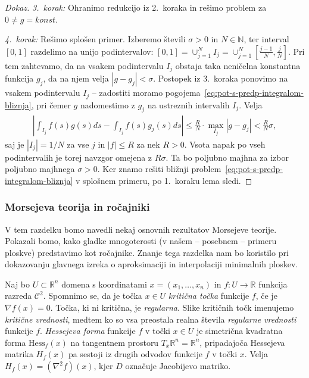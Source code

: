 \documentclass[12pt,a4paper,twoside]{article}
\theoremstyle{definition} %
\newenvironment{dokaz}[1][Dokaz]{\begin{proof}[#1]}{\end{proof}}
\theoremstyle{plain} %
\numberwithin{equation}{section}  %
\newcommand{\R}{\mathbb R}
\begin{document}
\begin{dokaz}
\textit{3.~korak:} Ohranimo redukcijo iz 2.~koraka in rešimo problem za $0 \neq g = konst.$ \newline

\textit{4.~korak:} Rešimo splošen primer. \newline
Izberemo števili $\sigma > 0$ in $N \in \mathbb{N}$, ter interval $[0,1]$ razdelimo na unijo podintervalov: $[0,1] = \cup_{j=1}^{N} I_{j} = \cup_{j=1}^{N} [\frac{j-1}{N}, \frac{j}{N}]$. Pri tem zahtevamo, da na vsakem podintervalu $I_{j}$ obstaja taka neničelna konstantna funkcija $g_{j}$, da na njem velja $|g - g_{j}| < \sigma$.
Postopek iz 3.~koraka ponovimo na vsakem podintervalu $I_{j}$ -- zadostiti moramo pogojema~\eqref{eq:pot-s-predp-integralom-bliznja}, pri čemer $g$ nadomestimo z $g_{j}$ na ustreznih intervalih $I_{j}$.
Velja
\begin{gather*}
\left| \int_{I_{j}} f(s)g(s)ds - \int_{I_{j}} f(s)g_{j}(s)ds \right| \leq \frac{R}{N} \cdot \max_{I_{j}} |g - g_{j}| < \frac{R}{N} \sigma,
\end{gather*}
saj je $|I_{j}| = 1/N$ za vse $j$ in $|f| \leq R$ za nek $R > 0$.
Vsota napak po vseh podintervalih je torej navzgor omejena z $R \sigma$. Ta bo poljubno majhna za izbor poljubno majhnega $\sigma >0$.
Ker znamo rešiti bližnji problem~\eqref{eq:pot-s-predp-integralom-bliznja} v splošnem primeru, po 1.~koraku lema sledi.
\end{dokaz}

\subsubsection{Morsejeva teorija in ročajniki}
%
V tem razdelku bomo navedli nekaj osnovnih rezultatov Morsejeve teorije. Pokazali bomo, kako gladke mnogoterosti (v našem -- posebnem -- primeru ploskve) predstavimo kot ročajnike. Znanje tega razdelka nam bo koristilo pri dokazovanju glavnega izreka o aproksimaciji in interpolaciji minimalnih ploskev.
   
Naj bo $U \subset \mathbb{R}^{n}$ domena s koordinatami $x = (x_{1}, \dots , x_{n})$ in $f \colon U \to \mathbb{R}$ funkcija razreda $\mathcal{C}^{2}$.
Spomnimo se, da je točka $x \in U$ \emph{kritična točka} funkcije $f$, če je $\nabla f(x) = 0$. Točka, ki ni kritična, je \emph{regularna}.
Slike kritičnih točk imenujemo \emph{kritične vrednosti}, medtem ko so vsa preostala realna števila \emph{regularne vrednosti} funkcije $f$. \newline
%
\emph{Hessejeva forma} funkcije $f$ v točki $x \in U$ je simetrična kvadratna forma $\text{Hess}_{f}(x)$ na tangentnem prostoru $T_{x}\R^{n} = \R^{n}$, pripadajoča Hessejeva matrika $H_{f}(x)$ pa sestoji iz drugih odvodov funkcije $f$ v točki $x$. Velja $H_{f}(x) = (\nabla ^2 f)(x)$, kjer $D$ označuje Jacobijevo matriko.
\end{document}
